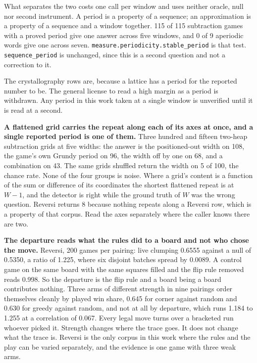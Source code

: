 What separates the two costs one call per window and uses neither oracle, null nor second instrument. A period is a property of a sequence; an approximation is a property of a sequence and a window together. 115 of 115 subtraction games with a proved period give one answer across five windows, and 0 of 9 aperiodic words give one across seven. \texttt{measure.\allowbreak{}periodicity.\allowbreak{}stable\_\allowbreak{}period} is that test. \texttt{sequence\_period} is unchanged, since this is a second question and not a correction to it.

The crystallography rows are, because a lattice has a period for the reported number to be. The general license to read a high margin as a period is withdrawn. Any period in this work taken at a single window is unverified until it is read at a second.

\textbf{A flattened grid carries the repeat along each of its axes at once, and a single reported period is one of them.} Three hundred and fifteen two-heap subtraction grids at five widths: the answer is the positioned-out width on 108, the game's own Grundy period on 96, the width off by one on 68, and a combination on 43. The same grids shuffled return the width on 5 of 100, the chance rate. None of the four groups is noise. Where a grid's content is a function of the sum or difference of its coordinates the shortest flattened repeat is at \(W-1\), and the detector is right while the ground truth of \(W\) was the wrong question. Reversi returns 8 because nothing repeats along a Reversi row, which is a property of that corpus. Read the axes separately where the caller knows there are two.

\textbf{The departure reads what the rules did to a board and not who chose the move.} Reversi, 200 games per pairing: live clumping 0.6555 against a null of 0.5350, a ratio of 1.225, where six disjoint batches spread by 0.0089. A control game on the same board with the same squares filled and the flip rule removed reads 0.998. So the departure is the flip rule and a board being a board contributes nothing. Three arms of different strength in nine pairings order themselves cleanly by played win share, 0.645 for corner against random and 0.630 for greedy against random, and not at all by departure, which runs 1.184 to 1.255 at a correlation of 0.067. Every legal move turns over a bracketed run whoever picked it. Strength changes where the trace goes. It does not change what the trace is. Reversi is the only corpus in this work where the rules and the play can be varied separately, and the evidence is one game with three weak arms.

